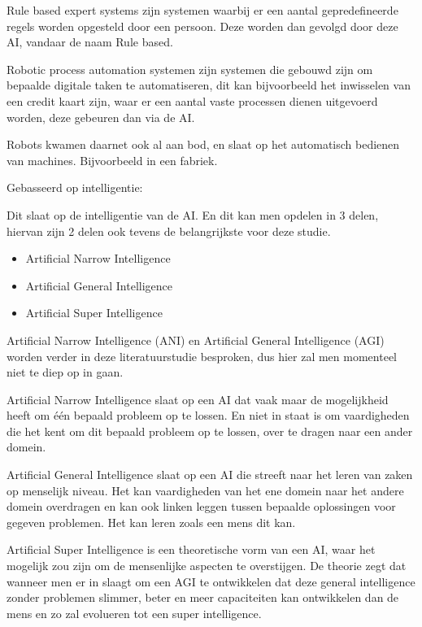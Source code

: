     Rule based expert systems zijn systemen waarbij er een aantal gepredefineerde regels worden opgesteld door een persoon. Deze worden dan gevolgd door deze AI, vandaar de naam Rule based.
    
    Robotic process automation systemen zijn systemen die gebouwd zijn om bepaalde digitale taken te automatiseren, dit kan bijvoorbeeld het inwisselen van een credit kaart zijn, waar er een aantal vaste processen dienen uitgevoerd worden, deze gebeuren dan via de AI.
    
    Robots kwamen daarnet ook al aan bod, en slaat op het automatisch bedienen van machines. Bijvoorbeeld in een fabriek.
    
Gebasseerd op intelligentie:

    Dit slaat op de intelligentie van de AI. En dit kan men opdelen in 3 delen, hiervan zijn 2 delen ook tevens de belangrijkste voor deze studie.
    \begin{itemize}
        \item Artificial Narrow Intelligence
        \item Artificial General Intelligence
        \item Artificial Super Intelligence
    \end{itemize}

    Artificial Narrow Intelligence (ANI) en Artificial General Intelligence (AGI) worden verder in deze literatuurstudie besproken, dus hier zal men momenteel niet te diep op in gaan. 
    
    Artificial Narrow Intelligence slaat op een AI dat vaak maar de mogelijkheid heeft om één bepaald probleem op te lossen. En niet in staat is om vaardigheden die het kent om dit bepaald probleem op te lossen, over te dragen naar een ander domein. 
    
    Artificial General Intelligence slaat op een AI die streeft naar het leren van zaken op menselijk niveau. Het kan vaardigheden van het ene domein naar het andere domein overdragen en kan ook linken leggen tussen bepaalde oplossingen voor gegeven problemen. Het kan leren zoals een mens dit kan.
    
    Artificial Super Intelligence is een theoretische vorm van een AI, waar het mogelijk zou zijn om de mensenlijke aspecten te overstijgen. De theorie zegt dat wanneer men er in slaagt om een AGI te ontwikkelen dat deze general intelligence zonder problemen slimmer, beter en meer capaciteiten kan ontwikkelen dan de mens en zo zal evolueren tot een super intelligence. 


